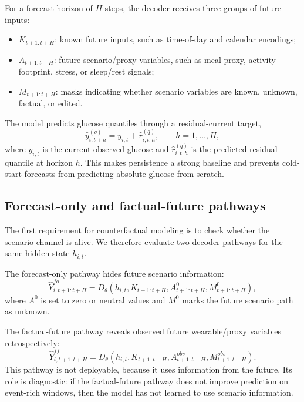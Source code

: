For a forecast horizon of $H$ steps, the decoder receives three groups of future inputs:
\begin{itemize}
    \item $K_{t+1:t+H}$: known future inputs, such as time-of-day and calendar encodings;
    \item $A_{t+1:t+H}$: future scenario/proxy variables, such as meal proxy, activity footprint, stress, or sleep/rest signals;
    \item $M_{t+1:t+H}$: masks indicating whether scenario variables are known, unknown, factual, or edited.
\end{itemize}
The model predicts glucose quantiles through a residual-current target,
\begin{equation}
    \hat{y}^{(q)}_{i,t+h} = y_{i,t} + \hat{r}^{(q)}_{i,t,h}, \qquad h=1,\ldots,H,
    \label{eq:residual_current}
\end{equation}
where $y_{i,t}$ is the current observed glucose and $\hat{r}^{(q)}_{i,t,h}$ is the predicted residual quantile at horizon $h$. This makes persistence a strong baseline and prevents cold-start forecasts from predicting absolute glucose from scratch.

\subsection{Forecast-only and factual-future pathways}
\label{subsec:fo_ff_pathways}

The first requirement for counterfactual modeling is to check whether the scenario channel is alive. We therefore evaluate two decoder pathways for the same hidden state $h_{i,t}$.

The forecast-only pathway hides future scenario information:
\begin{equation}
    \hat{Y}^{fo}_{i,t+1:t+H}
    = D_\theta(h_{i,t}, K_{t+1:t+H}, A^0_{t+1:t+H}, M^0_{t+1:t+H}),
    \label{eq:fo_decoder}
\end{equation}
where $A^0$ is set to zero or neutral values and $M^0$ marks the future scenario path as unknown.

The factual-future pathway reveals observed future wearable/proxy variables retrospectively:
\begin{equation}
    \hat{Y}^{ff}_{i,t+1:t+H}
    = D_\theta(h_{i,t}, K_{t+1:t+H}, A^{obs}_{t+1:t+H}, M^{obs}_{t+1:t+H}).
    \label{eq:ff_decoder}
\end{equation}
This pathway is not deployable, because it uses information from the future. Its role is diagnostic: if the factual-future pathway does not improve prediction on event-rich windows, then the model has not learned to use scenario information.

